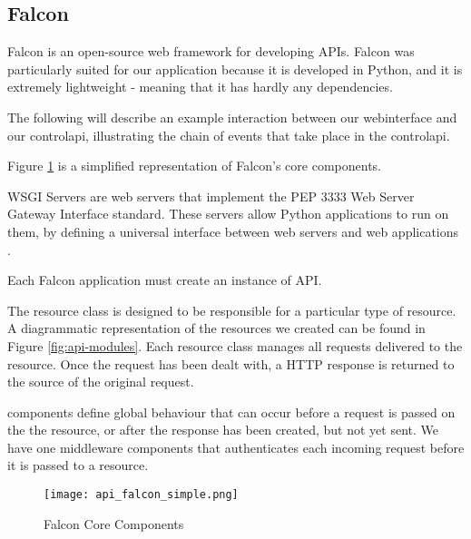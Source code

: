 \subsection{Falcon}

Falcon is an open-source web framework for developing \glspl{API}. Falcon was particularly suited for our application because it is developed in Python, and it is extremely lightweight - meaning that it has hardly any dependencies.

The following will describe an example interaction between our \gls{webinterface} and our \gls{controlapi}, illustrating the chain of events that take place in the \gls{controlapi}.

Figure \ref{fig:api-falcon-simple} is a simplified representation of Falcon's core components. 

\begin{description}
\item{WSGI Servers} are web servers that implement the PEP 3333 Web Server Gateway Interface standard. These servers allow Python applications to run on them, by defining a universal interface between web servers and web applications \cite{pep-3333}.

\item [Application] Each Falcon application must create an instance of API. 

\item [Resource] The resource class is designed to be responsible for a particular type of resource. A diagrammatic representation of the resources we created can be found in Figure \ref{fig:api-modules}. Each resource class manages all requests delivered to the resource. Once the request has been dealt with, a HTTP response is returned to the source of the original request.

\item [Middleware] components define global behaviour that can occur before a request is passed on the the resource, or after the response has been created, but not yet sent. We have one middleware components that authenticates each incoming request before it is passed to a resource.
\end{description}

\begin{figure}[!htb]
\begin{center}
\texttt{[image: api\_falcon\_simple.png]}
\end{center}
\caption{Falcon Core Components}
\label{fig:api-falcon-simple}
\end{figure}




